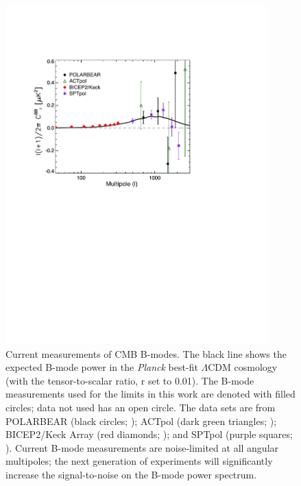 \documentclass[apj]{emulateapj}
\newcommand{\lcdm}{\ensuremath{\Lambda}CDM}
\newcommand{\planck}{{\sl Planck}}
\begin{document}
\begin{figure}[htb]\centering
\includegraphics[width=0.9\textwidth,clip,trim={1.5cm 12.5cm 5cm 3.8cm}]{pmf_experiments.pdf}
  \caption[Current measurements of CMB B-modes]{
  Current measurements of CMB B-modes. 
    The black line shows the expected B-mode power in the \planck{} best-fit \lcdm{} cosmology (with the tensor-to-scalar ratio, r set to 0.01). 
    The B-mode measurements used for the limits in this work are denoted with filled circles; data not used has an open circle. 
  The data sets are from POLARBEAR (black circles; \citet{polarbear14b}); ACTpol (dark green triangles; \citet{naess14});  BICEP2/Keck Array (red diamonds; \citet{bicepkeck15}); and SPTpol (purple squares; \citet{keisler15}). 
      Current B-mode measurements are noise-limited at all angular multipoles; the next generation of experiments will significantly increase the signal-to-noise on the B-mode power spectrum. 
           \label{fig:pmf-experiments}
  }
\end{figure}
\end{document}
